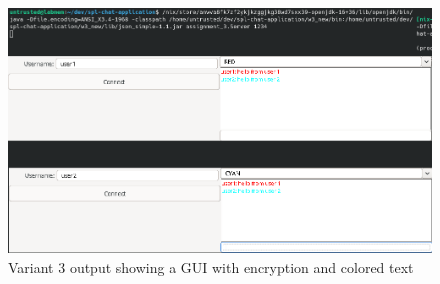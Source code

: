 \documentclass{article}
\begin{document}
\begin{figure}[!htbp]
    \centering
    \includegraphics[width=1.0\textwidth]{figures/variant3.png}
    \caption{Variant 3 output showing a GUI with encryption and colored text}
    \label{fig:var3}
\end{figure}
\end{document}
